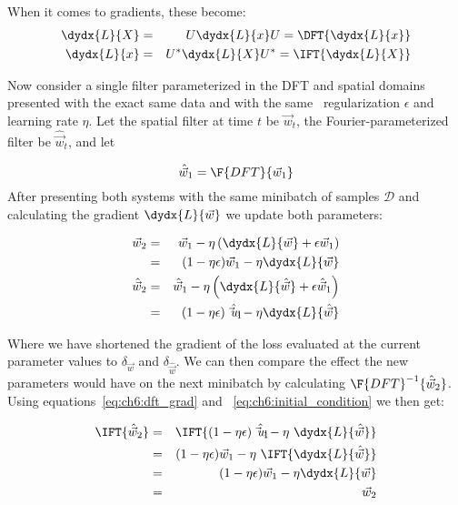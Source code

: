 When it comes to gradients, these become:
\begin{eqnarray}
  \dydx{L}{X} &=& U \dydx{L}{x} U = \DFT{\dydx{L}{x}} \label{eq:ch6:dft_grad}\\
  \dydx{L}{x} &=& U^* \dydx{L}{X} U^* = \IFT{\dydx{L}{X}}
\end{eqnarray}

Now consider a single filter parameterized in the DFT and spatial domains
presented with the exact same data and with the same \ltwo\ regularization
$\epsilon$ and learning rate $\eta$. Let
the spatial filter at time $t$ be $\vec{w}_t$, the Fourier-parameterized
filter be $\hat{\vec{w}}_t$, and let 

\begin{equation}
  \hat{\vec{w}}_1 = \F{DFT}\{\vec{w}_1\} \label{eq:ch6:initial_condition}
\end{equation}
%
After presenting both systems with the same minibatch of samples $\mathcal{D}$
and calculating the gradient $\dydx{L}{\vec{w}}$ we update both parameters:

\begin{eqnarray}
  \vec{w}_2 & = & \vec{w}_1 - \eta \left(
    \dydx{L}{\vec{w}} + \epsilon \vec{w}_1 \right) \\
    &=& (1-\eta\epsilon)\vec{w}_1 - \eta \dydx{L}{\vec{w}} \\
  \hat{\vec{w}}_2 & = & \hat{\vec{w}}_1 - \eta \left(
     \dydx{L}{\hat{\vec{w}}} + \epsilon \hat{\vec{w}}_1 \right)  \\
     &=& (1-\eta\epsilon)\hat{\vec{w}_1} - \eta \dydx{L}{\hat{\vec{w}}} \\
\end{eqnarray}

Where we have shortened the gradient of the loss evaluated at the current
parameter values to $\delta_{\vec{w}}$ and $\delta_{\hat{\vec{w}}}$.
We can then compare the effect the new parameters would have on the next
minibatch by calculating $\F{DFT}^{-1} \{\hat{\vec{w}}_2 \}$. Using
equations~\ref{eq:ch6:dft_grad} and ~\ref{eq:ch6:initial_condition} we then get:

\begin{eqnarray}
  \IFT{\hat{\vec{w}}_2} &=& \IFT{(1-\eta\epsilon)\hat{\vec{w}_1} - \eta\ \dydx{L}{\hat{\vec{w}}}} \\       
                        & = & (1-\eta\epsilon)\vec{w}_1 - \eta\ \IFT{ \dydx{L}{\hat{\vec{w}}}} \\
                        & = & (1-\eta\epsilon)\vec{w}_1 - \eta \dydx{L}{\vec{w}} \\
                        & = & \vec{w}_2
\end{eqnarray}


